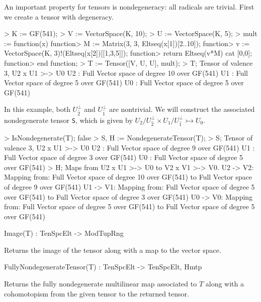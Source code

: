\begin{example}[Nondegeneracy]

An important property for tensors is nondegeneracy: all radicals are trivial.
First we create a tensor with degeneracy.
\begin{code}
> K := GF(541);
> V := VectorSpace(K, 10);
> U := VectorSpace(K, 5);
> mult := function(x)
function>   M := Matrix(3, 3, Eltseq(x[1])[2..10]);
function>   v := VectorSpace(K, 3)!(Eltseq(x[2])[[1,3,5]]);
function>   return Eltseq(v*M) cat [0,0];
function> end function;
> T := Tensor([V, U, U], mult);
> T;
Tensor of valence 3, U2 x U1 >-> U0
U2 : Full Vector space of degree 10 over GF(541)
U1 : Full Vector space of degree 5 over GF(541)
U0 : Full Vector space of degree 5 over GF(541)
\end{code}

In this example, both $U_{\widehat{2}}^\perp$ and $U_{\widehat{1}}^\perp$ are nontrivial.
We will construct the associated nondegenerate tensor {\tt S}, which is given by $U_2/U_{\widehat{2}}^\perp \times U_1/U_{\widehat{1}}^\perp \rightarrowtail U_0$. 
\begin{code}
> IsNondegenerate(T);
false
> S, H := NondegenerateTensor(T);
> S;
Tensor of valence 3, U2 x U1 >-> U0
U2 : Full Vector space of degree 9 over GF(541)
U1 : Full Vector space of degree 3 over GF(541)
U0 : Full Vector space of degree 5 over GF(541)
> H;
Maps from U2 x U1 >-> U0 to V2 x V1 >-> V0.
U2 -> V2: Mapping from: Full Vector space of degree 10 over GF(541) to 
Full Vector space of degree 9 over GF(541)
U1 -> V1: Mapping from: Full Vector space of degree 5 over GF(541) to 
Full Vector space of degree 3 over GF(541)
U0 -> V0: Mapping from: Full Vector space of degree 5 over GF(541) to 
Full Vector space of degree 5 over GF(541)
\end{code}
\end{example}

\begin{intrinsics}
Image(T) : TenSpcElt -> ModTupRng
\end{intrinsics}

Returns the image of the tensor along with a map to the vector space.

\begin{intrinsics}
FullyNondegenerateTensor(T) : TenSpcElt -> TenSpcElt, Hmtp
\end{intrinsics}

Returns the fully nondegenerate multilinear map associated to $T$ along with a
cohomotopism from the given tensor to the returned tensor.


